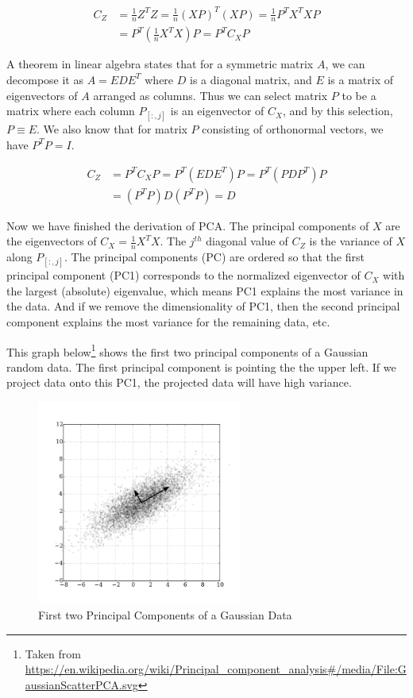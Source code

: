 \documentclass[a4paper]{article}
\begin{document}
\begin{align}
  C_Z &= \frac{1}{n} Z^T Z = \frac{1}{n} (XP)^T (XP) = \frac{1}{n} P^T X^T X P \\
 &= P^T (\frac{1}{n} X^T X) P = P^T C_X P
\end{align}

A theorem in linear algebra states that for a symmetric matrix $A$, we can decompose it as $A=EDE^T$ where $D$ is a diagonal matrix, and $E$ is a matrix of eigenvectors of $A$ arranged as columns. Thus we can select matrix $P$ to be a matrix where each column $P_{[:,j]}$ is an eigenvector of $C_X$, and by this selection, $P \equiv E$. We also know that for matrix $P$ consisting of orthonormal vectors, we have $P^TP = I$.

\begin{align}
  C_Z &= P^T C_X P = P^T (EDE^T)P = P^T (PDP^T) P \\
&= (P^TP) D (P^TP) = D
\end{align}

Now we have finished the derivation of PCA. The principal components of $X$ are the eigenvectors of $C_X = \frac{1}{n}X^TX$. The $j^{th}$ diagonal value of $C_Z$ is the variance of $X$ along $P_{[:, j]}$. The principal components (PC) are ordered so that the first principal component (PC1) corresponds to the normalized eigenvector of $C_X$ with the largest (absolute) eigenvalue, which means PC1 explains the most variance in the data. And if we remove the dimensionality of PC1, then the second principal component explains the most variance for the remaining data, etc.

This graph below\footnote{Taken from \url{https://en.wikipedia.org/wiki/Principal_component_analysis\#/media/File:GaussianScatterPCA.svg}} shows the first two principal components of a Gaussian random data. The first principal component is pointing the the upper left. If we project data onto this PC1, the projected data will have high variance.

\begin{figure}[H]
\centering
\includegraphics[width=0.6\textwidth]{GaussianScatterPCA.png}
\caption{First two Principal Components of a Gaussian Data}
\end{figure}
\end{document}
